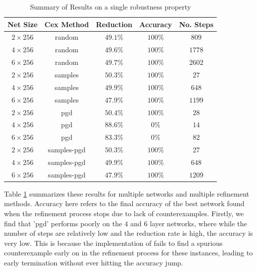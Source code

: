 \begin{table}
\begin{tabular}{|c|c|c|c|c|}
    \hline
    Net Size     & Cex Method  & Reduction & Accuracy & No. Steps \\
    \hline
    $2\times256$ & random      & $49.1\%$  & $100\%$  & $ 809$    \\
    $4\times256$ & random      & $49.6\%$  & $100\%$  & $1778$    \\
    $6\times256$ & random      & $49.7\%$  & $100\%$  & $2602$    \\
    $2\times256$ & samples     & $50.3\%$  & $100\%$  & $  27$    \\
    $4\times256$ & samples     & $49.9\%$  & $100\%$  & $ 648$    \\
    $6\times256$ & samples     & $47.9\%$  & $100\%$  & $1199$    \\
    $2\times256$ & pgd         & $50.4\%$  & $100\%$  & $  28$    \\
    $4\times256$ & pgd         & $88.6\%$  & $  0\%$  & $  14$    \\
    $6\times256$ & pgd         & $83.3\%$  & $  0\%$  & $  82$    \\
    $2\times256$ & samples-pgd & $50.3\%$  & $100\%$  & $  27$    \\
    $4\times256$ & samples-pgd & $49.9\%$  & $100\%$  & $ 648$    \\
    $6\times256$ & samples-pgd & $47.9\%$  & $100\%$  & $1209$    \\
    \hline
\end{tabular}
\caption{Summary of \mnist Results on a single robustness property }
\label{t:mnist-prop-summary}
\end{table}

Table \ref{t:mnist-prop-summary} summarizes these results for multiple \mnist
networks and multiple refinement methods. Accuracy here refers to the final
accuracy of the best network found when the refinement process stops due to lack
of counterexamples. Firstly, we find that 'pgd' performs poorly on the $4$ and
$6$ layer networks, where while the number of steps are relatively low and the
reduction rate is high, the accuracy is very low. This is because the \abcrown
implementation of \pgd fails to find a spurious counterexample early on in the
refinement process for these instances, leading to early termination without
ever hitting the accuracy jump. 

